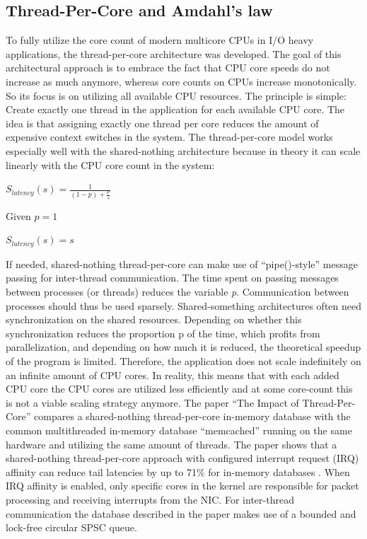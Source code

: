 \subsection{Thread-Per-Core and Amdahl’s law}
To fully utilize the core count of modern multicore CPUs in I/O heavy applications, the thread-per-core architecture was developed. The goal of this architectural approach is to embrace the fact that CPU core speeds do not increase as much anymore, whereas core counts on CPUs increase monotonically. So its focus is on utilizing all available CPU resources. The principle is simple: Create exactly one thread in the application for each available CPU core. The idea is that assigning exactly one thread per core reduces the amount of expensive context switches in the system. \newline
The thread-per-core model works especially well with the shared-nothing architecture because in theory it can scale linearly with the CPU core count in the system:  \newline
\centerline{$S_{latency}(s) = \frac{1}{(1 - p) + \frac{p}{s}}$}
\centerline{Given $p = 1$}
\centerline{$S_{latency}(s) = s$} 
If needed, shared-nothing thread-per-core can make use of “pipe()-style” message passing for inter-thread communication. The time spent on passing messages between processes (or threads) reduces the variable \textit{p}. Communication between processes should thus be used sparsely.  \newline
Shared-something architectures often need synchronization on the shared resources.
Depending on whether this synchronization reduces the proportion p of the time, which profits from parallelization, and depending on how much it is reduced, the theoretical speedup of the program is limited. Therefore, the application does not scale indefinitely on an infinite amount of CPU cores. In reality, this means that with each added CPU core the CPU cores are utilized less efficiently and at some core-count this is not a viable scaling strategy anymore. \newline
The paper “The Impact of Thread-Per-Core” compares a shared-nothing thread-per-core in-memory database with the common multithreaded in-memory database “memcached” running on the same hardware and utilizing the same amount of threads. The paper shows that a shared-nothing thread-per-core approach with configured interrupt request (IRQ) affinity can reduce tail latencies by up to 71\% for in-memory databases  \cite{peassa:thread_per_core}.
When IRQ affinity is enabled, only specific cores in the kernel are responsible for packet processing and receiving interrupts from the NIC. \newline
For inter-thread communication the database described in the paper makes use of a bounded and lock-free circular SPSC queue.

